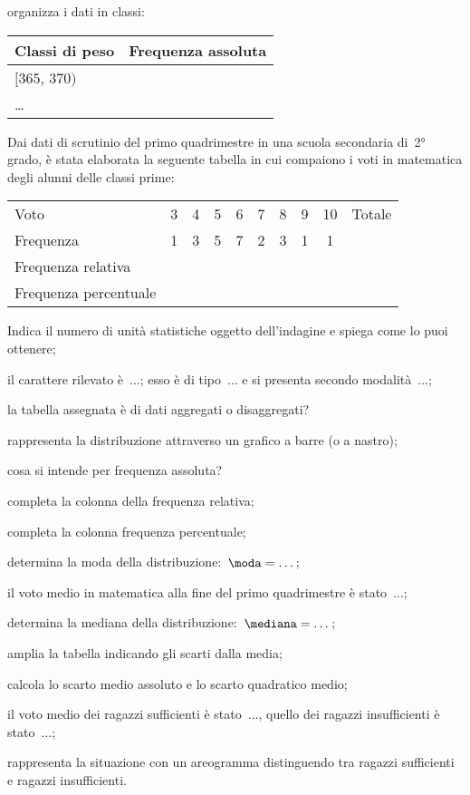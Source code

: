 \begin{esercizio}
\begin{enumeratea}
\item organizza i dati in classi:
\begin{center}
\begin{tabular}{lc}
\toprule
Classi di peso & Frequenza assoluta\\
\midrule
$[365$, $370)$ & \\
\ldots & \\
\bottomrule
\end{tabular}
\end{center}
\end{enumeratea}
\end{esercizio}

\begin{esercizio}
\label{ese:A.47}
Dai dati di scrutinio del primo quadrimestre in una scuola secondaria di~2° grado, è stata elaborata la seguente tabella in cui compaiono i voti in matematica degli alunni delle classi prime:
\begin{center}
\begin{tabular}{l*{9}{c}}
\toprule
Voto&3 &4 &5 &6 &7 &8 &9 &10 &Totale\\
Frequenza &1&3&5&7&2&3&1&1&\\
Frequenza relativa&&&&&&&&&\\
Frequenza percentuale&&&&&&&&&\\
\bottomrule
\end{tabular}
\end{center}
\begin{enumeratea}
 \item Indica il numero di unità statistiche oggetto dell'indagine e spiega come lo puoi ottenere;
 \item il carattere rilevato è~$\dots$; esso è di tipo~$\dots$ e si presenta secondo modalità~$\dots$;
 \item la tabella assegnata è di dati aggregati o disaggregati?
 \item rappresenta la distribuzione attraverso un grafico a barre (o a nastro);
 \item cosa si intende per frequenza assoluta?
 \item completa la colonna della frequenza relativa;
 \item completa la colonna frequenza percentuale;
 \item determina la moda della distribuzione:~$\moda = \dots$;
 \item il voto medio in matematica alla fine del primo quadrimestre è stato~$\dots$;
 \item determina la mediana della distribuzione:~$\mediana= \dots$;
 \item amplia la tabella indicando gli scarti dalla media;
 \item calcola lo scarto medio assoluto e lo scarto quadratico medio;
 \item il voto medio dei ragazzi sufficienti è stato~$\dots$, quello dei ragazzi insufficienti è stato~$\dots$;
 \item rappresenta la situazione con un areogramma distinguendo tra ragazzi sufficienti e ragazzi insufficienti.
 \end{enumeratea}
\end{esercizio}

